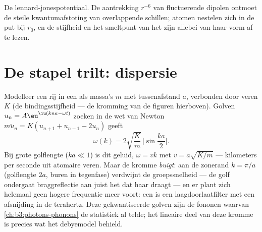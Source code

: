\begin{omfigure}

{\small De lennard-jonespotentiaal. De aantrekking $r^{-6}$ van
fluctuerende dipolen ontmoet de steile kwantumafstoting van
overlappende schillen; atomen nestelen zich in de put bij $r_0$, en de
stijfheid en het smeltpunt van het  zijn allebei van haar vorm af te lezen.}
\end{omfigure}

\section{De stapel trilt: dispersie}

\begin{theorem}\label{thm:b3:crystalline-solids:dispersion}
Modelleer een rij in een  als massa's $m$ met tussenafstand $a$, verbonden door veren
$K$ (de bindingsstijfheid --- de kromming van de figuren hierboven).
Golven $u_n = A\eu^{\iu(kna - \omega t)}$ zoeken in de wet van Newton
$m\ddot u_n = K(u_{n+1} + u_{n-1} - 2u_n)$ geeft
\[
\omega(k) = 2\sqrt{\frac{K}{m}}\,\Big|\sin\frac{ka}{2}\Big| .
\]
Bij grote golflengte ($ka \ll 1$) is dit geluid, $\omega = vk$ met
$v = a\sqrt{K/m}$ --- kilometers per seconde uit atomaire veren.
Maar de kromme \emph{buigt}: aan de zonerand $k = \pi/a$
(golflengte $2a$, buren in tegenfase) verdwijnt de groepssnelheid
--- de golf ondergaat braggreflectie aan juist het  dat haar draagt ---
en er plant zich helemaal geen hogere frequentie meer voort: een  is een
laagdoorlaatfilter met een afsnijding in de terahertz. Deze gekwantiseerde golven zijn
de fononen waarvan \cref{ch:b3:photons-phonons} de statistiek al
telde; het lineaire deel van deze kromme is precies wat het debyemodel
behield.
\end{theorem}

